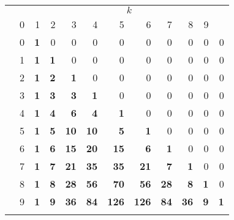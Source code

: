 \documentclass[11pt]{article}
\begin{document}
\TeXtoEPS
\begin{tabular}{||c|c||rrrrrrrrrr||}
\hhline{~~|t:==========:t|}
\multicolumn{1}{c}{} &   & \multicolumn{10}{c||}{\(k\)}\\
\hhline{~~||----------||}
\multicolumn{2}{c||}{\raisebox{1.9ex}[0cm][0cm]{\(\dbinom{r}{k}\)}}
          & 0 & 1 & 2 & 3 & 4 & 5 & 6 & 7 & 8 & 9\\
\hhline{|t:==::==========:|}
\multirow{10}{1.7mm}{\(r\)}
      & 0 & \textbf{1} & 0 &  0 &  0 &   0 &   0 &  0 &  0 & 0 & 0\\
      & 1 & \textbf{1} & \textbf{1} &  0 &  0 &   0 &   0 &  0 &  0 & 0 & 0\\
      & 2 & \textbf{1} & \textbf{2} &  \textbf{1} &  0 &   0 &   0 &  0 &  0 & 0 & 0\\
      & 3 & \textbf{1} & \textbf{3} &  \textbf{3} &  \textbf{1} &   0 &   0 &  0 &  0 & 0 & 0\\
      & 4 & \textbf{1} & \textbf{4} &  \textbf{6} &  \textbf{4} &   \textbf{1} &   0 &  0 &  0 & 0 & 0\\
      & 5 & \textbf{1} & \textbf{5} & \textbf{10} & \textbf{10} &   \textbf{5} &   \textbf{1} &  0 &  0 & 0 & 0\\
      & 6 & \textbf{1} & \textbf{6} & \textbf{15} & \textbf{20} &  \textbf{15} &   \textbf{6} &  \textbf{1} &  0 & 0 & 0\\
      & 7 & \textbf{1} & \textbf{7} & \textbf{21} & \textbf{35} &  \textbf{35} &  \textbf{21} &  \textbf{7} &  \textbf{1} & 0 & 0\\
      & 8 & \textbf{1} & \textbf{8} & \textbf{28} & \textbf{56} &  \textbf{70} &  \textbf{56} & \textbf{28} &  \textbf{8} & \textbf{1} & 0\\
      & 9 & \textbf{1} & \textbf{9} & \textbf{36} & \textbf{84} & \textbf{126} & \textbf{126} & \textbf{84} & \textbf{36} & \textbf{9} & \textbf{1}\\
\hhline{|b:==:b:==========:b|}
\end{tabular}
\endTeXtoEPS
\end{document}
